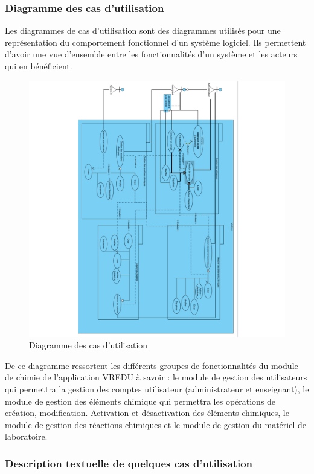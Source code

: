 \subsubsection{Diagramme des cas d’utilisation}

Les diagrammes de cas d'utilisation sont des diagrammes utilisés pour une représentation du comportement fonctionnel d'un système logiciel. Ils permettent d’avoir une vue d’ensemble entre les fonctionnalités d’un système et les acteurs qui en bénéficient.

\begin{figure}[H]
	\centering
	\includegraphics[trim={10cm 0 0 0}, width=1\textwidth]{img/ucd}
	\caption{Diagramme des cas d’utilisation}
	\label{fig:mesh1}
\end{figure}

De ce diagramme ressortent les différents groupes de fonctionnalités du module de chimie de l’application VREDU à savoir :  le module de gestion des utilisateurs qui permettra la gestion des comptes utilisateur (administrateur et enseignant), le module de gestion des éléments chimique qui permettra les opérations de création, modification. Activation et désactivation des éléments chimiques, le module de gestion des réactions chimiques et le module de gestion du matériel de laboratoire.

\subsubsection{Description textuelle de quelques cas d’utilisation}

